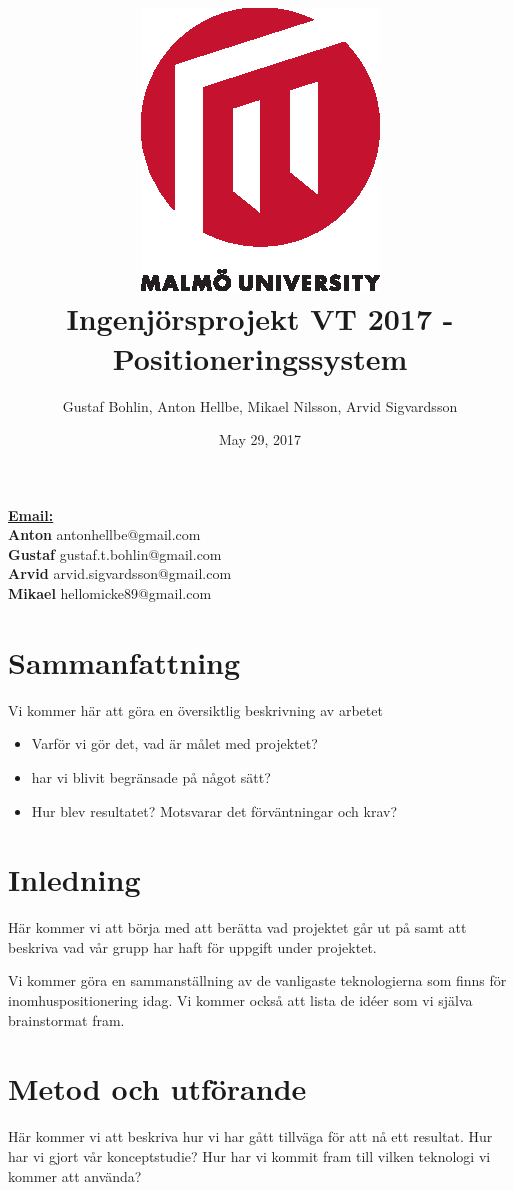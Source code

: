 \documentclass{article}
\title{\includegraphics{mah_logo.eps} \\[2 cm] Ingenjörsprojekt VT 2017 - Positioneringssystem}
\author{Gustaf Bohlin, Anton Hellbe, Mikael Nilsson, Arvid Sigvardsson}
\date{May 29, 2017}
\begin{document}
\begin{titlepage}
\maketitle

\vfill
\begin{flushleft}
{\bf \underline{Email:}} \\
{\bf Anton} antonhellbe@gmail.com \\
{\bf Gustaf} gustaf.t.bohlin@gmail.com \\
{\bf Arvid} arvid.sigvardsson@gmail.com\\
{\bf Mikael} hellomicke89@gmail.com \\




\end{flushleft}
\centering  
\thispagestyle{empty}
\clearpage
\end{titlepage}

\section{Sammanfattning} 
Vi kommer här att göra en översiktlig beskrivning av arbetet
\begin{itemize}
\item Varför vi gör det, vad är målet med projektet?
\item har vi blivit begränsade på något sätt?
\item Hur blev resultatet? Motsvarar det förväntningar och krav?

\end{itemize} 
\newpage
\tableofcontents
\thispagestyle{empty}
\clearpage

\section{Inledning}
Här kommer vi att börja med att berätta  vad projektet går ut på samt att beskriva vad vår grupp har haft för uppgift under projektet.

Vi kommer göra en sammanställning av de vanligaste teknologierna som finns för inomhuspositionering idag. Vi kommer också att lista de idéer som vi själva brainstormat fram.
 


\section{Metod och utförande}
Här kommer vi att beskriva hur vi har gått tillväga för att nå ett resultat. 
Hur har vi gjort vår konceptstudie? Hur har vi kommit fram till vilken teknologi vi kommer att använda?
\end{document}
